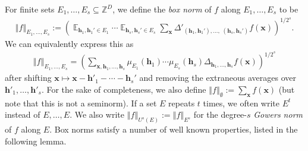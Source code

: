 \documentclass[11pt]{amsart}
\theoremstyle{definition}
\DeclareMathOperator*{\E}{\mathbb{E}}
\newcommand{\Z}{{\mathbb Z}}
\newcommand{\bh}{{\mathbf{h}}}
\newcommand{\bx}{{\textbf{x}}}
\newcommand{\norm}[1]{\left\Vert #1\right\Vert}
\newcommand{\brac}[1]{\mathopen{}\left( #1 \mathclose{}\right)}
\begin{document}
For finite sets  $E_1, \ldots, E_s\subseteq \Z^D$, we define the \textit{box norm} of $f$ {along}  $E_1, \ldots, E_s$ to be
\begin{align*}
    \norm{f}_{E_1, \ldots, E_s}:=\brac{\E_{\bh_1, \bh_1'\in E_1}\cdots\E_{\bh_s, \bh_s'\in E_s}\sum_\bx \Delta'_{(\bh_1, \bh_1'), \ldots,\; (\bh_s,\bh_s')}f(\bx)}^{1/2^s}.
\end{align*}
We can equivalently express this as
\begin{align}\label{E: box norms with Fejer kernels}
    \norm{f}_{E_1, \ldots, E_s} = \brac{\sum_{\bx, \bh_1, \ldots, \bh_s} \mu_{E_1}(\bh_1)\cdots \mu_{E_s}(\bh_s) \Delta_{\bh_1, \ldots, \bh_s}f(\bx)}^{1/2^s}
\end{align}
after shifting $\bx\mapsto \bx-\bh'_1-\cdots - \bh_s'$ and removing the extraneous averages over $\bh'_1, \ldots, \bh'_s$.
For the sake of completeness, we also define $\norm{f}_\emptyset:= \sum_\bx f(\bx)$ (but note that this is not a seminorm).  If a set $E$ repeats $t$ times, we often write $E^t$ instead of $E, \ldots, E$.  We also write $\norm{f}_{U^s(E)} := \norm{f}_{E^s}$ for the degree-$s$ \textit{Gowers norm} of $f$ along $E$.
Box norms satisfy a number of well known properties, listed in the following lemma.
\end{document}
